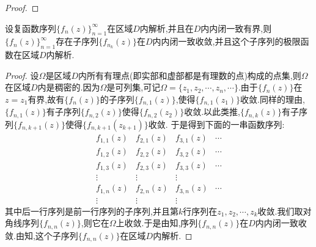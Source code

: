\documentclass[../../main.tex]{subfiles}%
\begin{document}
\begin{proof}
\end{proof}

\begin{theorem}\label{theorem:Montel(蒙泰尔)定理}
设复函数序列$\{f_n(z)\}_{n=1}^{\infty}$在区域$D$内解析,并且在$D$内内闭一致有界,则$\{f_n(z)\}_{n=1}^{\infty}$存在子序列$\{f_{n_k}(z)\}$在$D$内内闭一致收敛,并且这个子序列的极限函数在区域$D$内解析.
\end{theorem}
\begin{proof}

设$\Omega$是区域$D$内所有有理点(即实部和虚部都是有理数的点)构成的点集,则$\Omega$在区域$D$内是稠密的.因为$\Omega$是可列集,可记$\Omega=\{z_1,z_2,\cdots,z_n,\cdots\}$.由于$\{f_n(z)\}$在$z=z_1$有界,故有$\{f_n(z)\}$的子序列$\{f_{n,1}(z)\}$,使得$\{f_{n,1}(z_1)\}$收敛.同样的理由,$\{f_{n,1}(z)\}$有子序列$\{f_{n,2}(z)\}$使得$\{f_{n,2}(z_2)\}$收敛.以此类推,$\{f_{n,k}(z)\}$有子序列$\{f_{n,k+1}(z)\}$使得$\{f_{n,k+1}(z_{k+1})\}$收敛. 于是得到下面的一串函数序列:
\[
\begin{array}{cccc}
f_{1,1}(z) & f_{2,1}(z) & f_{3,1}(z) & \cdots \\
f_{1,2}(z) & f_{2,2}(z) & f_{3,2}(z) & \cdots \\
f_{1,3}(z) & f_{2,3}(z) & f_{3,3}(z) & \cdots \\
\vdots & \vdots & \vdots & \\
f_{1,n}(z) & f_{2,n}(z) & f_{3,n}(z) & \cdots \\
\vdots & \vdots & \vdots &
\end{array}
\]
其中后一行序列是前一行序列的子序列,并且第$k$行序列在$z_1,z_2,\cdots,z_k$收敛.我们取对角线序列$\{f_{n,n}(z)\}$,则它在$\Omega$上收敛.于是由知,序列$\{f_{n,n}(z)\}$在$D$内内闭一致收敛.由知,这个子序列$\{f_{n,n}(z)\}$在区域$D$内解析.

\end{proof}
\end{document}
